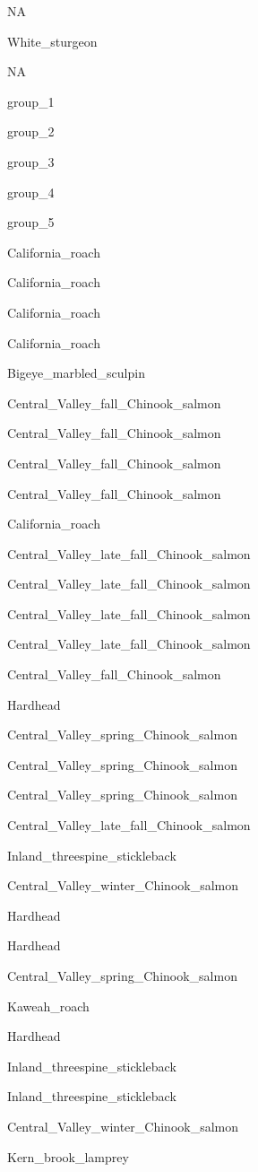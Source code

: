 \documentclass[]{article}
\begin{document}
NA

White\_sturgeon

NA

group\_1

group\_2

group\_3

group\_4

group\_5

California\_roach

California\_roach

California\_roach

California\_roach

Bigeye\_marbled\_sculpin

Central\_Valley\_fall\_Chinook\_salmon

Central\_Valley\_fall\_Chinook\_salmon

Central\_Valley\_fall\_Chinook\_salmon

Central\_Valley\_fall\_Chinook\_salmon

California\_roach

Central\_Valley\_late\_fall\_Chinook\_salmon

Central\_Valley\_late\_fall\_Chinook\_salmon

Central\_Valley\_late\_fall\_Chinook\_salmon

Central\_Valley\_late\_fall\_Chinook\_salmon

Central\_Valley\_fall\_Chinook\_salmon

Hardhead

Central\_Valley\_spring\_Chinook\_salmon

Central\_Valley\_spring\_Chinook\_salmon

Central\_Valley\_spring\_Chinook\_salmon

Central\_Valley\_late\_fall\_Chinook\_salmon

Inland\_threespine\_stickleback

Central\_Valley\_winter\_Chinook\_salmon

Hardhead

Hardhead

Central\_Valley\_spring\_Chinook\_salmon

Kaweah\_roach

Hardhead

Inland\_threespine\_stickleback

Inland\_threespine\_stickleback

Central\_Valley\_winter\_Chinook\_salmon

Kern\_brook\_lamprey
\end{document}
